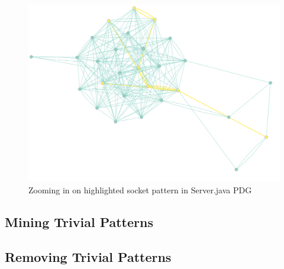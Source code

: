 \documentclass[12pt]{article}
\begin{document}
\begin{figure}[ht]
\centerline{
\includegraphics[width=\linewidth]{patterns/networking_isomorphism_zoomed.png}
}
\caption{\label{networking_isomorphism_zoomed}
    Zooming in on highlighted socket pattern in Server.java PDG
}
\end{figure}


\subsection{Mining Trivial Patterns}

\subsection{Removing Trivial Patterns}
\end{document}
